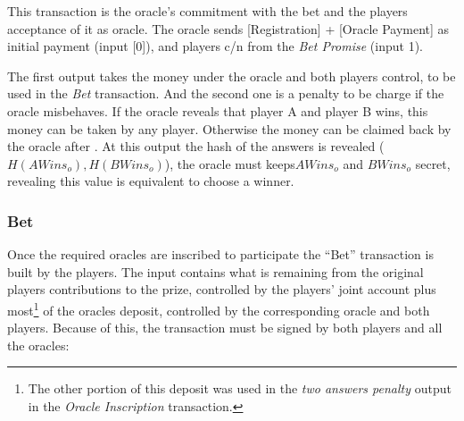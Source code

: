 This transaction is the oracle's commitment with the bet and the players
  acceptance of it as oracle.
The oracle sends [Registration] + [Oracle Payment] as initial payment
  (input [0]), and players c/n from the \textit{Bet Promise} (input 1).

The first output takes the money under the oracle and both players control, to
  be used in the \textit{Bet} transaction.
And the second one is a penalty to be charge if the oracle misbehaves.
If the oracle reveals that player A and player B wins, this money can be taken
  by any player. Otherwise the money can be claimed back by the oracle after
  .
At this output the hash of the answers is revealed ($H(AWins_o), H(BWins_o)$),
  the oracle must keeps$AWins_o$ and $BWins_o$ secret, revealing this value is
  equivalent to choose a winner.

\subsubsection{Bet}

Once the required oracles are inscribed to participate the ``Bet'' transaction
  is built by the players.
 The input contains what is remaining from the original players contributions to
   the prize, controlled by the players' joint account plus most\footnote{The
  other portion of this deposit was used in the \textit{two answers penalty}
  output in the \textit{Oracle Inscription} transaction.} of the oracles
  deposit, controlled by the corresponding oracle and both players.
Because of this, the transaction must be signed by both players and all the
  oracles:

